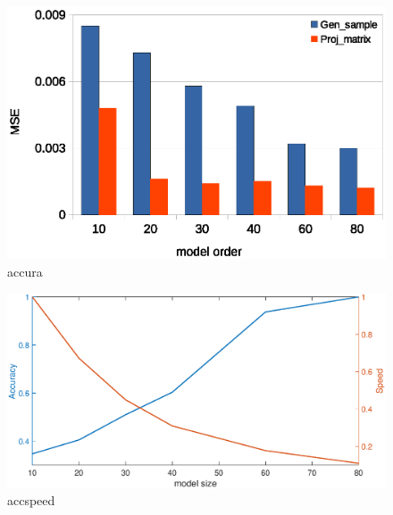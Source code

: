 \begin{figure}
	\centering
	\includegraphics[width=1.0\columnwidth]{exp/chart_accuracy1.eps}
	\caption{accura}
	\label{fig_acc}
\end{figure}






\begin{figure}
	\centering
	\includegraphics[width=1.0\columnwidth]{exp/fig_acc&speed.eps}
	\caption{accspeed}
	\label{fig_accu&speed}
\end{figure}





